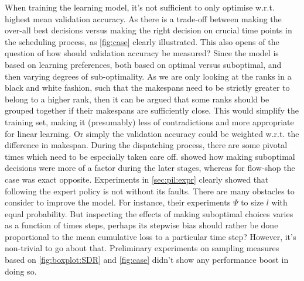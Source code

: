 \documentclass[smallextended]{svjour3}
\begin{document}
	When training the learning model, it's not sufficient to only optimise w.r.t. 
	highest mean validation accuracy. As there is a trade-off between making the 
	over-all best decisions versus making the right decision on crucial time points 
	in the scheduling process, as \cref{fig:case} clearly illustrated. 
	This also opens of the question of how should validation accuracy be measured? 
	Since the model is based on learning preferences, both based on optimal versus 
	suboptimal, and then varying degrees of sub-optimality. As we are only looking 
	at the ranks in a black and white fashion, such that the makespans need to be 
	strictly greater to belong to a higher rank, then it can be argued that some 
	ranks should be grouped together if their makespans are sufficiently close. 
	This would simplify the training set, making it (presumably) less of 
	contradictions and more appropriate for linear learning. Or simply the 
	validation accuracy could be weighted w.r.t. the  difference in 
	makespan.
	During the dispatching process, there are some pivotal times which need to be 
	especially taken care off.  showed how making suboptimal 
	decisions were more of a factor during the later stages, whereas for flow-shop 
	the case was exact opposite. 
	Experiments in \cref{sec:pil:expr} clearly showed that following the expert 
	policy is not without its faults. There are many obstacles to consider to 
	improve the model. 
	For instance, their experiments $\Psi$ to size $l$ with equal 
	probability. But inspecting the effects of making suboptimal choices varies as 
	a function of times steps, perhaps its stepwise bias should rather be done 
	proportional to the mean cumulative loss to a particular time step? 
	However, it's non-trivial to go about that. Preliminary experiments on sampling 
	measures based on \cref{fig:boxplot:SDR} and \cref{fig:case} didn't show any 
	performance boost in doing so.
	
\end{document}
